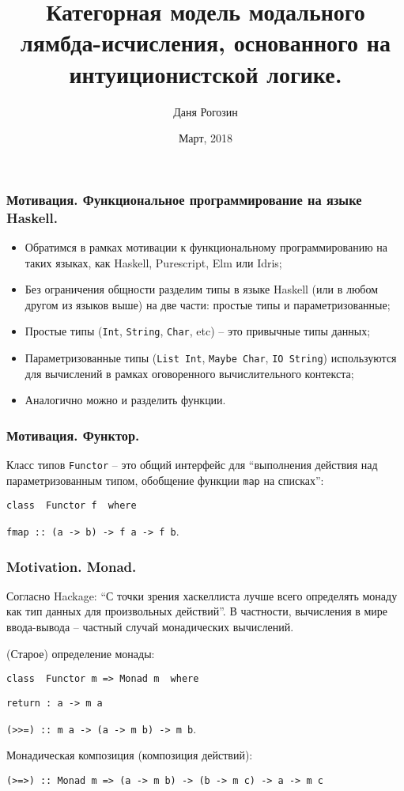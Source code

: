 \documentclass[10pt,pdf,utf8,russian,aspectratio=169]{beamer}
\title{Категорная модель модального лямбда-исчисления, основанного на интуиционистской логике.}
\institute{МГУ}
\author{Даня Рогозин}
\date{Март, 2018}
\begin{document}
\maketitle

\begin{frame}
  \frametitle{Мотивация. Функциональное программирование на языке Haskell.}
  \begin{itemize}
    \item Обратимся в рамках мотивации к функциональному программированию на таких языках, как
      Haskell, Purescript, Elm или Idris;
    \item Без ограничения общности разделим типы в языке Haskell (или в любом другом из языков выше) на две части:
    простые типы и параметризованные;
    \item Простые типы (\verb"Int", \verb"String", \verb"Char", etc) -- это привычные типы данных;
    \item Параметризованные типы (\verb"List Int", \verb"Maybe Char", \verb"IO String") используются для
    вычислений в рамках оговоренного вычислительного контекста;
    \item Аналогично можно и разделить функции.
  \end{itemize}
\end{frame}

\begin{frame}
\frametitle{Мотивация. Функтор.}
Класс типов \verb"Functor" -- это общий интерфейс для ``выполнения действия над параметризованным типом, обобщение функции \verb"map" на списках'':

\vspace{\baselineskip}

\verb"class  Functor f  where"

\quad\quad \verb"fmap :: (a -> b) -> f a -> f b".

\end{frame}

\begin{frame}
\frametitle{Motivation. Monad.}
Согласно Hackage: ``С точки зрения хаскеллиста лучше всего определять монаду как тип данных для произвольных действий''.
В частности, вычисления в мире ввода-вывода -- частный случай монадических вычислений.

\vspace{\baselineskip}

(Старое) определение монады:

\verb"class  Functor m => Monad m  where"

\quad\quad \verb"return : a -> m a"

\quad\quad \verb"(>>=) :: m a -> (a -> m b) -> m b".

\vspace{\baselineskip}

Монадическая композиция (композиция действий):

\verb"(>=>) :: Monad m => (a -> m b) -> (b -> m c) -> a -> m c"

\end{frame}
\end{document}
